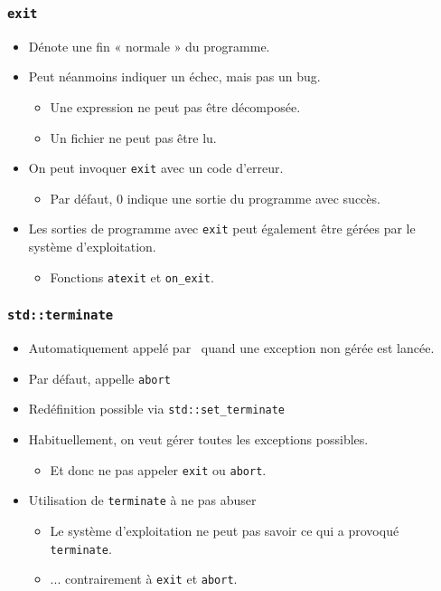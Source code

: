 \begin{frame}
\frametitle{\texttt{exit}}
\begin{itemize}[<+->]
\item Dénote une fin « normale » du programme.
\item Peut néanmoins indiquer un échec, mais pas un bug.
	\begin{itemize}
	\item Une expression ne peut pas être décomposée.
	\item Un fichier ne peut pas être lu.
	\end{itemize}
\item On peut invoquer \texttt{exit} avec un code d'erreur.
	\begin{itemize}
	\item Par défaut, $0$ indique une sortie du programme avec succès.
	\end{itemize}
\item Les sorties de programme avec \texttt{exit} peut également être gérées par le système d'exploitation.
	\begin{itemize}
	\item Fonctions \texttt{atexit} et \texttt{on\_exit}.
	\end{itemize}
\end{itemize}
\end{frame}

\begin{frame}
\frametitle{\texttt{std::terminate}}
\begin{itemize}[<+->]
\item Automatiquement appelé par \cpp\ quand une exception non gérée est lancée.
\item Par défaut, appelle \texttt{abort}
\item Redéfinition possible via \texttt{std::set\_terminate}
\item Habituellement, on veut gérer toutes les exceptions possibles.
	\begin{itemize}
	\item Et donc ne pas appeler \texttt{exit} ou \texttt{abort}.
	\end{itemize}
\item Utilisation de \texttt{terminate} à ne pas abuser
	\begin{itemize}
	\item Le système d'exploitation ne peut pas savoir ce qui a provoqué \texttt{terminate}.
	\item ... contrairement à \texttt{exit} et \texttt{abort}.
	\end{itemize}
\end{itemize}
\end{frame}

